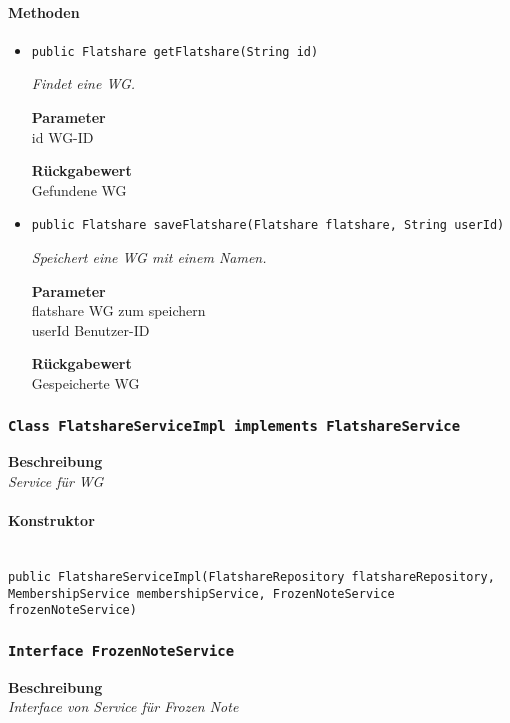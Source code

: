      \paragraph*{Methoden}
     \begin{itemize}
     	\item{\texttt{public Flatshare getFlatshare(String id)}}
     	
     	\textit{Findet eine WG.}
     	
     	\textbf{Parameter} \\
     	id WG-ID
     	
     	\textbf{Rückgabewert} \\
     	Gefundene WG        \item{\texttt{public Flatshare saveFlatshare(Flatshare flatshare, String userId)}}
     	
     	\textit{Speichert eine WG mit einem Namen.}
     	
     	\textbf{Parameter} \\
     	flatshare WG zum speichern\\
     	userId Benutzer-ID
     	
     	\textbf{Rückgabewert} \\
     	Gespeicherte WG
     \end{itemize}
     \subsubsection{\texttt{Class FlatshareServiceImpl implements FlatshareService}}
     \textbf{Beschreibung} \\
     \textit{Service für WG}
     \paragraph*{Konstruktor}\mbox{} \\
     \texttt{public FlatshareServiceImpl(FlatshareRepository flatshareRepository, MembershipService membershipService, FrozenNoteService frozenNoteService)} \\
     \subsubsection{\texttt{Interface FrozenNoteService}}
     \textbf{Beschreibung} \\
     \textit{Interface von Service für Frozen Note}
